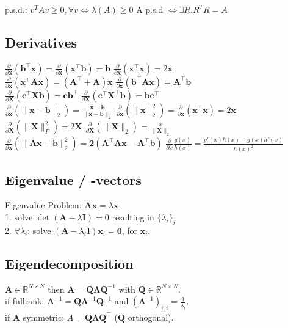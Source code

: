 p.s.d.: $v^TAv \geq 0, \forall v \Leftrightarrow \lambda(A) \geq 0$
A p.s.d $\Leftrightarrow \exists R. R^TR = A$

\subsection*{Derivatives}
$\frac{\partial}{\partial \mathbf{x}}(\mathbf{b}^\top \mathbf{x}) = \frac{\partial}{\partial \mathbf{x}}(\mathbf{x}^\top \mathbf{b}) = \mathbf{b}$ \quad
$\frac{\partial}{\partial \mathbf{x}}(\mathbf{x}^\top \mathbf{x}) = 2\mathbf{x}$\\
$\frac{\partial}{\partial \mathbf{x}}(\mathbf{x}^\top \mathbf{A}\mathbf{x}) = (\mathbf{A}^\top + \mathbf{A})\mathbf{x}$ \quad
$\frac{\partial}{\partial \mathbf{x}}(\mathbf{b}^\top \mathbf{A}\mathbf{x}) = \mathbf{A}^\top \mathbf{b}$\\
$\frac{\partial}{\partial \mathbf{X}}(\mathbf{c}^\top \mathbf{X} \mathbf{b}) = \mathbf{c}\mathbf{b}^\top$ \quad
$\frac{\partial}{\partial \mathbf{X}}(\mathbf{c}^\top \mathbf{X}^\top \mathbf{b}) = \mathbf{b}\mathbf{c}^\top$\\
$\frac{\partial}{\partial \mathbf{x}}(\| \mathbf{x}-\mathbf{b} \|_2) = \frac{\mathbf{x}-\mathbf{b}}{\|\mathbf{x}-\mathbf{b}\|_2}$ \quad
$\frac{\partial}{\partial \mathbf{x}}(\|\mathbf{x}\|^2_2) = \frac{\partial}{\partial \mathbf{x}} (\mathbf{x}^\top \mathbf{x}) = 2\mathbf{x}$\\
$\frac{\partial}{\partial \mathbf{X}}(\|\mathbf{X}\|_F^2) = 2\mathbf{X}$ \quad
$\frac{\partial}{\partial \mathbf{X}}(\|\mathbf{X}\|_2) = \frac{x}{\|\mathbf{X}\|_2}$ \\ 

$\frac{\partial}{\partial \mathbf{x}}(\|\mathbf{Ax - b}\|_2^2) = \mathbf{2(A^\top Ax-A^\top b)}$
$\frac{\partial}{\partial x}\frac{g(x)}{h(x)} = \frac{g'(x)h(x) - g(x)h'(x)}{h(x)^2}$


\subsection*{Eigenvalue / -vectors}
Eigenvalue Problem: $\mathbf{Ax} = \lambda \mathbf{x}$\\
1. solve $\operatorname{det}(\mathbf{A} - \lambda \mathbf{I}) \overset{!}{=} 0$ resulting in $\{\lambda_i\}_i$\\
2. $\forall \lambda_i$:
solve $(\mathbf{A} - \lambda_i \mathbf{I}) \mathbf{x}_i = \mathbf{0}$, for $\mathbf{x}_i$.

\subsection*{Eigendecomposition}
$\mathbf{A} \in \mathbb{R}^{N \times N}$ then $\mathbf{A} = \mathbf{Q} \boldsymbol{\Lambda} \mathbf{Q}^{-1}$ with $\mathbf{Q} \in \mathbb{R}^{N \times N}$.\\
if fullrank: $\mathbf{A}^{-1} = \mathbf{Q} \boldsymbol{\Lambda}^{-1} \mathbf{Q}^{-1}$ and $(\boldsymbol{\Lambda}^{-1})_{i,i} = \frac{1}{\lambda_i}$.\\
if $\mathbf{A}$ symmetric: $A = \mathbf{Q} \boldsymbol{\Lambda} \mathbf{Q^\top}$ ($\mathbf{Q}$ orthogonal).

